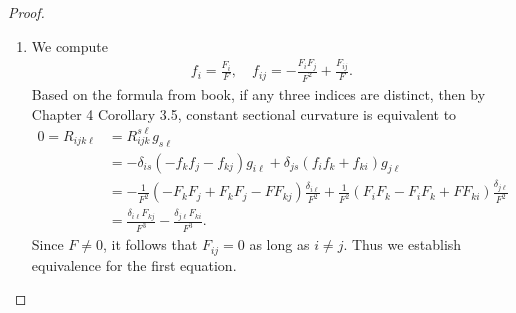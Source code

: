 \documentclass[12pt]{article}
\begin{document}
\begin{proof}
\begin{enumerate}[label=(\alph*)]
	\item We compute
	\begin{align*}
		f_i = \frac{F_i}{ F}, \quad f_{ij} = -\frac{F_iF_j}{ F^2} + \frac{F_{ij} }{ F}.
	\end{align*}
	Based on the formula from book, if any three indices are distinct, then by Chapter 4 Corollary 3.5, constant sectional curvature is equivalent to
	\begin{align*}
		0= R_{ijk\ell} &= R_{ijk}^{s \ell} g_{s \ell} \\
		&= -\delta_{is}(-f_k f_j - f_{kj}) g_{i\ell} + \delta_{js}(f_if_k+f_{ki})g_{j\ell}  \\
		&= -\frac{1}{F^2}(-F_k F_j + F_kF_j - F F_{kj}) \frac{\delta_{i \ell}}{ F^2} + \frac{1}{F^2}(F_iF_k- F_i F_k+F F_{ki}) \frac{\delta_{j\ell}}{ F^2}  \\
		&= \frac{ \delta_{i \ell}F_{kj}} {F^3} - \frac{ \delta_{j\ell}F_{ki}}{F^3}  .
	\end{align*}
	Since $ F \neq 0$, it follows that  $ F_{ij} =0$ as long as $ i \neq j$. Thus we establish equivalence for the first equation.


\end{enumerate}
\end{proof}
\end{document}
